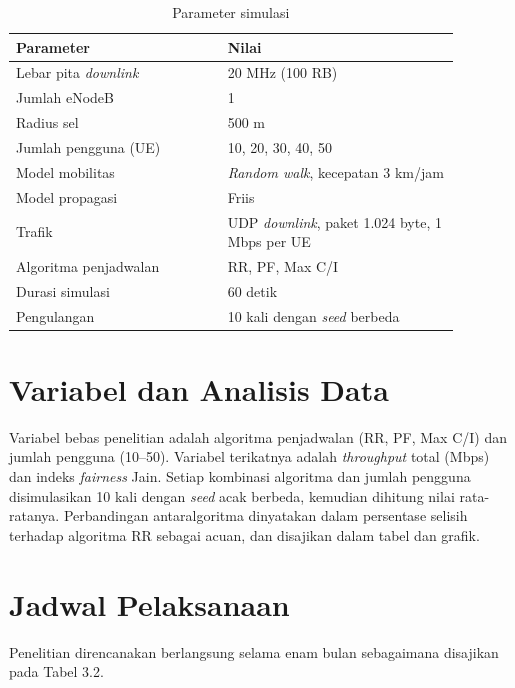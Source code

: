 \begin{singlespace}
\begin{longtable}{|p{0.42\linewidth}|p{0.46\linewidth}|}
\caption{Parameter simulasi}\\
\hline
\textbf{Parameter} & \textbf{Nilai} \\
\hline
Lebar pita \textit{downlink} & 20 MHz (100 RB) \\
\hline
Jumlah eNodeB & 1 \\
\hline
Radius sel & 500 m \\
\hline
Jumlah pengguna (UE) & 10, 20, 30, 40, 50 \\
\hline
Model mobilitas & \textit{Random walk}, kecepatan 3 km/jam \\
\hline
Model propagasi & Friis \\
\hline
Trafik & UDP \textit{downlink}, paket 1.024 byte, 1 Mbps per UE \\
\hline
Algoritma penjadwalan & RR, PF, Max C/I \\
\hline
Durasi simulasi & 60 detik \\
\hline
Pengulangan & 10 kali dengan \textit{seed} berbeda \\
\hline
\end{longtable}
\end{singlespace}

\section{Variabel dan Analisis Data}
Variabel bebas penelitian adalah algoritma penjadwalan (RR, PF, Max C/I) dan jumlah pengguna (10--50). Variabel terikatnya adalah \textit{throughput} total (Mbps) dan indeks \textit{fairness} Jain. Setiap kombinasi algoritma dan jumlah pengguna disimulasikan 10 kali dengan \textit{seed} acak berbeda, kemudian dihitung nilai rata-ratanya. Perbandingan antaralgoritma dinyatakan dalam persentase selisih terhadap algoritma RR sebagai acuan, dan disajikan dalam tabel dan grafik.

\needspace{10cm}
\section{Jadwal Pelaksanaan}
Penelitian direncanakan berlangsung selama enam bulan sebagaimana disajikan pada Tabel 3.2.

